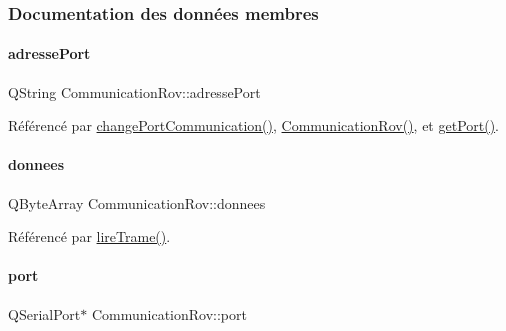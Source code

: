 \subsubsection{Documentation des données membres}
\mbox{\label{class_communication_rov_a7bd5d36d065005b27ed6cb421c7ffe42}} 
\paragraph{\texorpdfstring{adresse\+Port}{adressePort}}
{\footnotesize\ttfamily Q\+String Communication\+Rov\+::adresse\+Port\hspace{0.3cm}{\ttfamily [private]}}



Référencé par \hyperlink{class_communication_rov_ad46397a58ba7704fbd5ac5748e083004}{change\+Port\+Communication()}, \hyperlink{class_communication_rov_a22b64c69228d392a212f543e071adc02}{Communication\+Rov()}, et \hyperlink{class_communication_rov_a6226f9338fffc648cfca91c8e585a26b}{get\+Port()}.

\mbox{\label{class_communication_rov_acbb6939bb597179956c6f4bc5ca39f3f}} 
\paragraph{\texorpdfstring{donnees}{donnees}}
{\footnotesize\ttfamily Q\+Byte\+Array Communication\+Rov\+::donnees\hspace{0.3cm}{\ttfamily [private]}}



Référencé par \hyperlink{class_communication_rov_a5822d2f41553221ea876ea09e148f859}{lire\+Trame()}.

\mbox{\label{class_communication_rov_a21b62067ef0b2a6aec339df60b4abd72}} 
\paragraph{\texorpdfstring{port}{port}}
{\footnotesize\ttfamily Q\+Serial\+Port$\ast$ Communication\+Rov\+::port\hspace{0.3cm}{\ttfamily [private]}}



